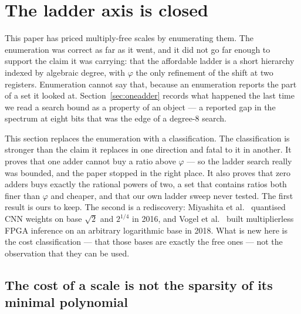 \documentclass[11pt]{article}
\theoremstyle{definition}
\begin{document}
\section{The ladder axis is closed}\label{sec:ladderclosed}\label{sec:hierarchy}

This paper has priced multiply-free scales by enumerating them. The enumeration
was correct as far as it went, and it did not go far enough to support the claim
it was carrying: that the affordable ladder is a short hierarchy indexed by
algebraic degree, with $\varphi$ the only refinement of the shift at two
registers. Enumeration cannot say that, because an enumeration reports the part
of a set it looked at. Section~\ref{sec:oneadder} records what happened the last
time we read a search bound as a property of an object --- a reported gap in the
spectrum at eight bits that was the edge of a degree-8 search.

This section replaces the enumeration with a classification. The classification
is stronger than the claim it replaces in one direction and fatal to it in
another. It proves that one adder cannot buy a ratio above $\varphi$ --- so the
ladder search really was bounded, and the paper stopped in the right place. It
also proves that zero adders buys exactly the rational powers of two, a set that
contains ratios both finer than $\varphi$ and cheaper, and that our own ladder
sweep never tested. The first result is ours to keep. The second is a
rediscovery: Miyashita et al.~\cite{miyashita} quantised CNN weights on base
$\sqrt{2}$ and $2^{1/4}$ in 2016, and Vogel et al.~\cite{vogel} built
multiplierless FPGA inference on an arbitrary logarithmic base in 2018. What is
new here is the cost classification --- that those bases are exactly the free
ones --- not the observation that they can be used.

\subsection{The cost of a scale is not the sparsity of its minimal polynomial}
\label{sec:sparsemult}
\end{document}
